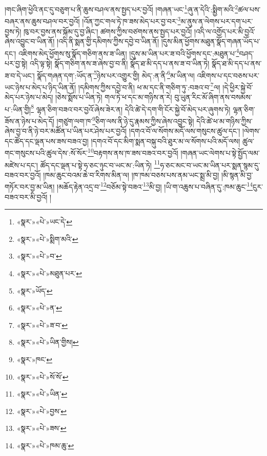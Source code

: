 །གང་ཞིག་ཕྱེའི་ནང་དུ་བཅུག་པ་ནི་ཆུས་བཤལ་ནས་སྤྱད་པར་བྱའོ། །གཞན་ཡང་\footnote{«སྣར་»«པེ་»ཡང་དེ་}ཞུ་ན་དེའི་:སྨྱིག་མའི་\footnote{«སྣར་»«པེ་»སྨིག་མའི་}ཚལ་པས་བཞར་ནས་ཆུས་བཤལ་བར་བྱའོ། །འོན་ཀྱང་གལ་ཏེ་ཁ་ཟས་མེད་པར་བྱ་བར་\footnote{«སྣར་»«པེ་»བ་}མ་ནུས་ན་ལེགས་པར་དག་པར་བྱས་ཏེ། ཁུ་བར་བྱས་ནས་སྐོམ་དུ་བྱ་ཞིང་། ཚགས་ཀྱིས་བཙགས་ནས་སྤྱད་པར་བྱའོ། །འདི་ལ་འགྱོད་པར་མི་བྱའོ་ཞེས་འབྱུང་བ་ཡིན་ནོ། །འདི་ནི་སྨན་གྱི་དམིགས་ཀྱིས་དབྱེ་བ་ཡིན་ནོ། །དུས་མིན་ཕྱོགས་མཐུན་སྣོད་གཞན་ཡོད་པ་དང་། འཇིགས་མེད་ཕྱོགས་སུ་སྣོད་གཅིག་ནས་ཟ་ཡིན། །དུས་མ་ཡིན་པར་ཟ་བའི་ཕྱོགས་དང་:མཐུན་པ་\footnote{«སྣར་»«པེ་»མཐུན་པར་}བཤད་པར་བྱ་སྟེ། འདི་ལྟ་སྟེ། སྣོད་གཅིག་ནས་ཟ་ཞེས་བྱ་བ་ནི། སྣོད་ཐ་མི་དད་པ་ནས་ཟ་བ་ཡིན་ཏེ། སྣོད་ཐ་མི་དད་པ་ནས་ཟ་བ་དེ་ཡང་། སྣོད་གཞན་དག་:ཡོད་ན་\footnote{«སྣར་»ཡོད་}ཉེས་པར་འགྱུར་གྱི། མེད་:ན་ནི་\footnote{«སྣར་»«པེ་»ན་}མ་ཡིན་ལ། འཇིགས་པ་དང་བཅས་པར་ཡང་ཉེས་པ་མེད་པ་ཉིད་ཡིན་ནོ། །དམིགས་ཀྱིས་དབྱེ་བ་ནི། ཕ་མ་དང་ནི་གཅིག་ཏུ་:བཟའ་བ་\footnote{«སྣར་»«པེ་»ཟ་བ་}ལ། །དེ་ཕྱིར་སྐྱེ་བོ་མེད་པར་ཉེས་པ་མེད། །ཅེས་སྨོས་པ་ཡིན་ཏེ། གལ་ཏེ་ཕ་དང་མ་གཉིས་ན་རེ། བུ་ཡུན་རིང་མོ་ཞིག་ནས་བསམས་པ་:ཡིན་གྱི།\footnote{«སྣར་»«པེ་»ཡིན་གྱིས།} ལྷན་ཅིག་བཟའ་བར་བྱའོ་ཞེས་ཟེར་ན། དེའི་ཚེ་དེ་དག་གི་ངོར་སྐྱེ་བོ་མེད་པར་ཞུགས་ཏེ། ལྷན་ཅིག་ཟོས་ན་ཉེས་པ་མེད་དོ། །གཙུག་ལག་ཁ་\footnote{«སྣར་»ཁང་}ཅིག་ལས་ནི་ཉེ་དུ་རྣམས་ཀྱིས་ཞེས་འབྱུང་སྟེ། དེའི་ཚེ་ཕ་མ་གཉིས་ཀྱིས་ཞེས་བྱ་བ་ནི་ཉེ་བར་མཚོན་པ་ཡིན་པར་ཤེས་པར་བྱའོ། །དགའ་བོ་ལ་སོགས་མདོ་ལས་གསུངས་ཚུལ་དང་། །ལེགས་དང་ཚོད་དང་ལྡན་པས་ཟས་བཟའ་བྱ། །དགའ་བོ་དང་མིག་སྨན་བསྐུ་བའི་ཐུར་མ་ལ་སོགས་པའི་མདོ་ལས། ཚུལ་གང་གསུངས་པའི་ཚུལ་དེས་:སོ་སོར་\footnote{«སྣར་»«པེ་»སོ་སོ་}བརྟགས་ནས་ཁ་ཟས་བཟའ་བར་བྱའོ། །གཞན་ཡང་ལེགས་པ་སྟེ་སྤྱོད་ལམ་མཛེས་པ་དང་། ཚོད་དང་ལྡན་པ་སྟེ་ཧ་ཅང་ཉུང་བ་ཡང་མ་:ཡིན་ཏེ། \footnote{«སྣར་»«པེ་»ཡིན་}ཧ་ཅང་མང་བ་ཡང་མ་ཡིན་པར་སྨན་སྙམ་དུ་བཟའ་བར་བྱའོ། །ཁམ་ཆུང་བའམ་ཆེ་བ་རིགས་མིན་ལ། །ཁ་ཁམ་བཅས་པས་ནམ་ཡང་སྨྲ་མི་བྱ། །མི་སྙན་མི་བྱ་གཏོར་བར་བྱ་མ་ཡིན། །མཆོད་རྟེན་འདྲ་བ་\footnote{«སྣར་»«པེ་»བྱས་}བཅོམ་སྟེ་བཟའ་\footnote{«སྣར་»«པེ་»ཟས་}མི་བྱ། །ཡི་ག་འཆུས་པ་བཞིན་དུ་:ཁམ་ཆུང་\footnote{«སྣར་»«པེ་»ཁམ་ཆུ་}ངུར་བཟའ་བར་མི་བྱའོ། །
